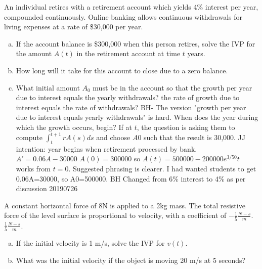 \documentclass[12pt]{book}
\begin{document}
\begin{exercise}
An individual retires with a retirement account which yields 4\% interest per year, compounded continuously.
Online banking allows continuous withdrawals for living expenses at a rate of \$30,000 per year.
\begin{enumerate}[a)]
    \item If the account balance is \$300,000 when this person retires, solve the IVP for the amount
    $A(t)$ in the retirement account at time $t$ years.
    \item How long will it take for this account to close due to a zero balance.
    \item What initial amount $A_0$ must be in the account so that 
    {\color{red}
    the growth per year due to interest equals the yearly withdrawals?
    }
    {\color{blue}
    the rate of growth due to interest equals the rate of withdrawals?
    }
    {\color{teal}BH- The version "growth per year due to interest equals yearly withdrawals" is hard. When does the year during which the growth occurs, begin? If at $t$, the question is asking them to compute $\int_t^{t+1} r A(s)ds$ and choose $A0$ such that the result is 30,000.
    JJ intention: year begins when retirement processed by bank. $A'=0.06A-30000$ $A(0)=300000$ so
    $A(t)=500000-200000 e^{3/50}t$ works from $t=0$.
    Suggested phrasing is clearer. I had wanted students
    to get 0.06A=30000, so A0=500000.
    }
    {\color{teal}BH Changed from 6\% interest to 4\%
    as per discussion 20190726}
\end{enumerate}

\end{exercise}



\begin{exercise}
A constant horizontal force of 8N is applied to a 2kg mass. The total resistive force of the level surface is proportional 
to velocity, with a coefficient of 
{\color{red}$-\frac{1}{5}\frac{N-s}{m}$.}
{\color{blue}$\frac{1}{5}\frac{N-s}{m}$.}
\begin{enumerate}[a)]
    \item If the initial velocity is 1 m/s, solve the IVP for $v(t)$.
    \item What was the initial velocity if the object is moving 20 m/s at 5 seconds?
\end{enumerate}

\end{exercise}
\end{document}
